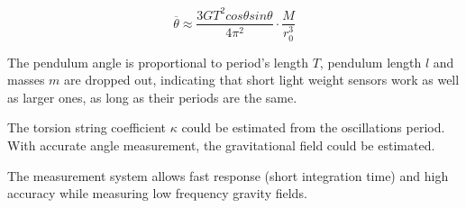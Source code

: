 \documentclass[\main/master.tex]{subfiles}
\begin{document}
\begin{equation}
\overline{\theta} \approx \frac{3GT^2cos\theta sin\theta}{4\pi^2 } \cdot \frac{M}{r_0^3}   \label{eqn:theta average}
\end{equation}
\par\noindent
The pendulum angle is proportional to period's length $T$, pendulum length $l$ and masses $m$ are dropped out, indicating that short light weight sensors work as well as larger ones, as long as their periods are the same.
\par\noindent
The torsion string coefficient $\kappa$ could be estimated from the oscillations period. With accurate angle measurement, the gravitational field could be estimated.
\par\noindent
The measurement system allows fast response (short integration time) and high accuracy while measuring low frequency gravity fields. 

 
 
 
 
\end{document}
